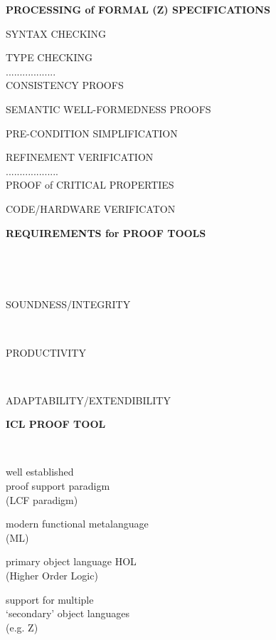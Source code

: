 \begin{slide}{}

\begin{center}

{\bf PROCESSING of FORMAL (Z) SPECIFICATIONS}

SYNTAX CHECKING

TYPE CHECKING\\
..................\\
CONSISTENCY PROOFS

SEMANTIC WELL-FORMEDNESS PROOFS

PRE-CONDITION SIMPLIFICATION

REFINEMENT VERIFICATION\\
...................\\
PROOF of CRITICAL PROPERTIES

CODE/HARDWARE VERIFICATON

\end{center}


\end{slide}

\begin{slide}{}

\begin{center}

{\bf  REQUIREMENTS for PROOF TOOLS}

\ 

\ 

SOUNDNESS/INTEGRITY

\ 

PRODUCTIVITY

\ 

ADAPTABILITY/EXTENDIBILITY

\end{center}

\end{slide}

\begin{slide}{}

\begin{center}

{\bf  ICL PROOF TOOL}

\ 

well established\\
proof support paradigm\\
(LCF paradigm)


modern functional metalanguage\\
(ML)


primary object language HOL\\
(Higher Order Logic)


support for multiple\\
`secondary' object languages\\
(e.g. Z)

\end{center}

\end{slide}


